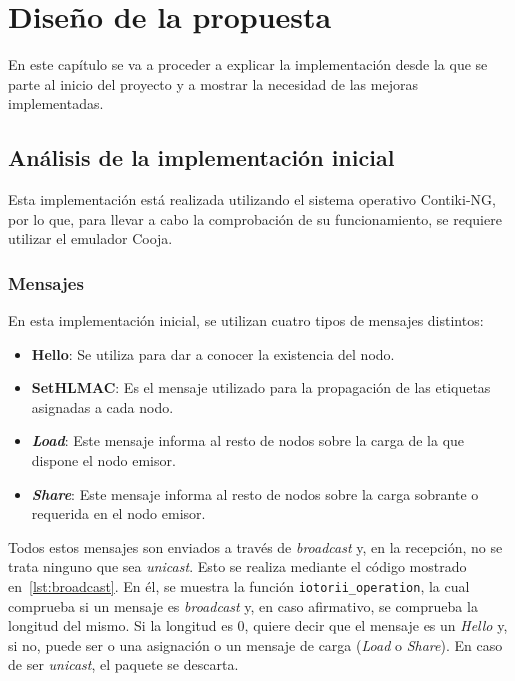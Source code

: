 \chapter{Diseño de la propuesta}\label{cha:diseño}

En este capítulo se va a proceder a explicar la implementación desde la que se parte al inicio del proyecto y a mostrar la necesidad de las mejoras implementadas.

\section{Análisis de la implementación inicial}\label{sec:analisis}

Esta implementación está realizada utilizando el sistema operativo Contiki-NG, por lo que, para llevar a cabo la comprobación de su funcionamiento, se requiere utilizar el emulador Cooja.

\subsection{Mensajes}\label{subsec:mensajes}

En esta implementación inicial, se utilizan cuatro tipos de mensajes distintos:

\begin{itemize}
    \item \textbf{Hello}: Se utiliza para dar a conocer la existencia del nodo.
    \item \textbf{SetHLMAC}: Es el mensaje utilizado para la propagación de las etiquetas asignadas a cada nodo.
    \item \textit{\textbf{Load}}: Este mensaje informa al resto de nodos sobre la carga de la que dispone el nodo emisor.
    \item \textit{\textbf{Share}}: Este mensaje informa al resto de nodos sobre la carga sobrante o requerida en el nodo emisor.
\end{itemize}

Todos estos mensajes son enviados a través de \textit{broadcast} y, en la recepción, no se trata ninguno que sea \textit{unicast}.
Esto se realiza mediante el código mostrado en~\ref{lst:broadcast}.
En él, se muestra la función \texttt{iotorii\_operation}, la cual comprueba si un mensaje es \textit{broadcast} y, en caso afirmativo, se comprueba la longitud del mismo.
Si la longitud es 0, quiere decir que el mensaje es un \textit{Hello} y, si no, puede ser o una asignación o un mensaje de carga (\textit{Load} o \textit{Share}).
En caso de ser \textit{unicast}, el paquete se descarta.

